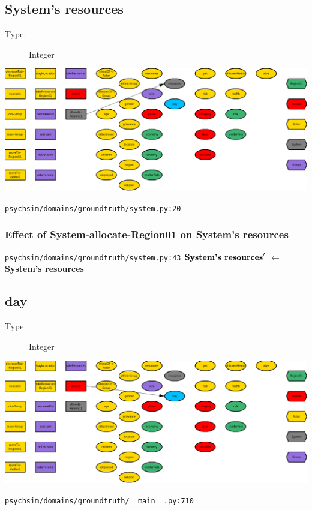 \documentclass{article}%
\begin{document}
%
\subsection{System's resources}%
\label{subsec:System's resources}%
\begin{description}%
\item[Type:]%
Integer%
\end{description}%
\includegraphics[width=\textwidth]{images/resourcesOfSystem.png}%
\begin{flushleft}%
\verb|psychsim/domains/groundtruth/system.py:20|%
\end{flushleft}%
\subsubsection{Effect of System{-}allocate{-}Region01 on System's resources}%
\label{ssubsec:Effect of System{-}allocate{-}Region01 on System's resources}%
\begin{flushleft}%
\verb|psychsim/domains/groundtruth/system.py:43|%
\linebreak%
$\mbox{\textbf{System's resources}} '$%
$\leftarrow$%
\textbf{System's resources}%
\end{flushleft}

%
\subsection{day}%
\label{subsec:day}%
\begin{description}%
\item[Type:]%
Integer%
\end{description}%
\includegraphics[width=\textwidth]{images/day.png}%
\begin{flushleft}%
\verb|psychsim/domains/groundtruth/__main__.py:710|%
\end{flushleft}%
\end{document}
